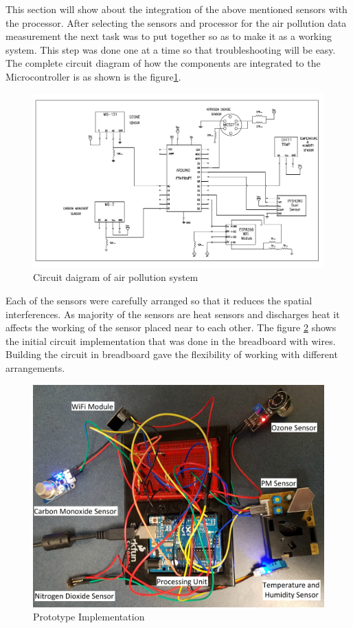  This section will show about the integration of the above mentioned sensors with the processor. After selecting the sensors and processor for the air pollution data measurement the next task was to put together so as to make it as a working system. This step was done one at a time so that troubleshooting will be easy. The complete circuit diagram of how the components are integrated to the Microcontroller is as shown is the figure\ref{circuit}.
 \begin{figure}[h]
  \begin{center}
  \includegraphics[scale=0.80]{./images/figure5.png}
  \end{center}
  \caption{Circuit daigram of air pollution system}
  \label{circuit}
\end{figure}
 Each of the sensors were carefully arranged so that it reduces the spatial interferences. As majority of the sensors are heat sensors and discharges heat it affects the working of the sensor placed near to each other. The figure \ref{prototype} shows the initial circuit implementation that was done in the breadboard with wires. Building the circuit in breadboard gave the flexibility of working with different arrangements.

 \begin{figure}[h]
  \begin{center}
  \includegraphics[scale=0.1]{./images/figure14.jpg}
  \end{center}
  \caption{Prototype Implementation}
  \label{prototype}
\end{figure}

